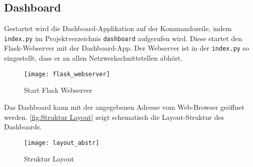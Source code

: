     \subsection{Dashboard}
    Gestartet wird die Dashboard-Applikation auf der Kommandozeile, indem \texttt{index.py} im Projektverzeichnis \texttt{dashboard}
    aufgerufen wird. Diese startet den Flask-Webserver mit der Dashboard-App. Der Webserver ist in der \texttt{index.py} so eingestellt, 
    dass er an allen Netzwerkschnittstellen abhört.


    \begin{figure}[H]
        \centering
            \texttt{[image: flask\_webserver]}
            \caption{Start Flask Webserver}
            \label{fig:flask}
    \end{figure}

    
    Das Dashboard kann mit der angegebenen Adresse vom Web-Browser geöffnet werden.
    \autoref{fig:Struktur Layout} zeigt schematisch die Layout-Struktur des Dashboards. 


    \begin{figure}[H]
        \centering
            \texttt{[image: layout\_abstr]}
            \caption{Struktur Layout}
            \label{fig:Struktur Layout}
    \end{figure}


